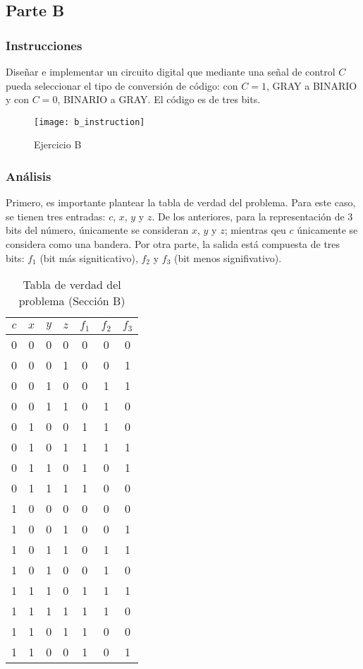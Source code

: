 \documentclass[../procedimientos.tex]{subfiles}
\begin{document}
\clearpage
\subsection{Parte B}
\subsubsection{Instrucciones}
Diseñar e implementar un circuito digital que mediante una señal de control 
$C$ pueda seleccionar el tipo de conversión de código: con $C=1$, GRAY a 
BINARIO y con $C=0$, BINARIO a GRAY. El código es de tres bits.
\begin{figure}[H]
  \centering
  \texttt{[image: b\_instruction]}
  \caption{Ejercicio B}
  \label{fig:b_inst}
\end{figure}

\subsubsection{Análisis}
Primero, es importante plantear la tabla de verdad del problema. Para este 
caso, se tienen  tres entradas: $c$, $x$, $y$ y $z$. De los anteriores, para 
la representación de 3 bits del número, únicamente se consideran $x$, $y$ y 
$z$; mientras qeu $c$ únicamente se considera como una bandera. Por otra 
parte, la salida está compuesta de tres bits: $f_1$ (bit más signiticativo), 
$f_2$ y $f_3$ (bit menos signifivativo).

\begin{table}[H]
  \centering
  \begin{tabular}{cccc|ccc}
    \hline
    $c$ & $x$ & $y$ & $z$ & $f_1$ & $f_2$ & $f_3$\\
    \hline
    0 & 0 & 0 & 0 & 0 & 0 & 0\\
    0 & 0 & 0 & 1 & 0 & 0 & 1\\
    0 & 0 & 1 & 0 & 0 & 1 & 1\\
    0 & 0 & 1 & 1 & 0 & 1 & 0\\
    0 & 1 & 0 & 0 & 1 & 1 & 0\\
    0 & 1 & 0 & 1 & 1 & 1 & 1\\
    0 & 1 & 1 & 0 & 1 & 0 & 1\\
    0 & 1 & 1 & 1 & 1 & 0 & 0\\
    1 & 0 & 0 & 0 & 0 & 0 & 0\\
    1 & 0 & 0 & 1 & 0 & 0 & 1\\
    1 & 0 & 1 & 1 & 0 & 1 & 1\\
    1 & 0 & 1 & 0 & 0 & 1 & 0\\
    1 & 1 & 1 & 0 & 1 & 1 & 1\\
    1 & 1 & 1 & 1 & 1 & 1 & 0\\
    1 & 1 & 0 & 1 & 1 & 0 & 0\\
    1 & 1 & 0 & 0 & 1 & 0 & 1\\
    \hline
  \end{tabular}
  \caption{Tabla de verdad del problema (Sección B)}
  \label{tab:tv_b}
\end{table}
\end{document}
